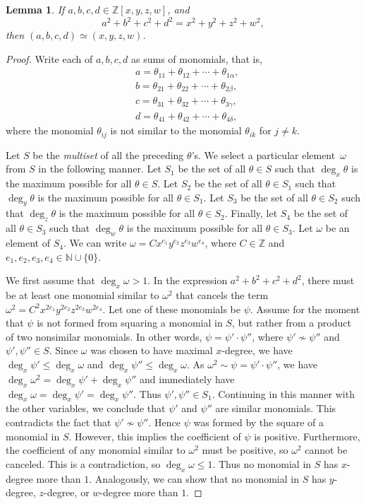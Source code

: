 \documentclass[12pt,table]{article}
\newtheorem{lemma}[theorem]{Lemma}
\theoremstyle{definition}
\theoremstyle{remark}
\newcommand{\Nnn}{\mathbb N}
\newcommand{\Zzz}{\mathbb Z}
\numberwithin{equation}{section}
\begin{document}
\begin{lemma}
If $a, b, c, d \in \Zzz[x,y,z,w]$, and
\[
a^2 + b^2 + c^2 + d^2 = x^2 + y^2 + z^2 + w^2,
\]
then $ (a, b, c, d ) \simeq (x, y, z, w )$.
\end{lemma}
\begin{proof}
Write each of $ a,b,c,d $ as sums of monomials, that is, 
\begin{align*}
&a = \theta_{11} + \theta_{12} + \dotsb + \theta_{1\alpha},
\\
&b = \theta_{21} + \theta_{22} + \dotsb + \theta_{2\beta},
\\
&c = \theta_{31} + \theta_{32} + \dotsb + \theta_{3\gamma},
\\
&d = \theta_{41} + \theta_{42} + \dotsb + \theta_{4\delta},
\end{align*}
where the monomial $ \theta_{ij}$ is not similar
to the monomial $\theta_{ik}$ for $ j \neq k$.

Let $S$ be the \emph{multiset} of all the preceding $ \theta $'s.
We select a particular element~$ \omega $
from $S$ in the following manner.
Let $ S_1 $ be the set of all $ \theta \in S  $ such that
$ \deg_x \theta $ is the maximum possible for all $ \theta \in S $.
Let $ S_2 $ be the set of all $ \theta \in S_1  $ such that
$ \deg_y \theta $ is the maximum possible for all $ \theta \in S_1 $.
Let $ S_3 $ be the set of all $ \theta \in S_2  $ such that
$ \deg_z \theta $ is the maximum possible for all $ \theta \in S_2 $.
Finally, let $ S_4 $ be the set of all $ \theta \in S_3  $ such that
$ \deg_w \theta $ is the maximum possible for all $ \theta \in S_3 $.
Let $ \omega $ be an element of $ S_4 $. 
We can write $ \omega = Cx^{e_1}y^{e_2}z^{e_3}w^{e_4}$, where $ C \in \Zzz $
and $ e_1,e_2,e_3,e_4 \in \Nnn \cup \{0\} $.

We first assume that $\deg_x \omega > 1 $.
In the expression  
$a^2 + b^2 + c^2 + d^2$, there must be at least one monomial similar to $ \omega^2 $
that cancels the term $ \omega^2 = C^2x^{2e_1}y^{2e_2}z^{2e_3}w^{2e_4}$.
Let one of these monomials be $ \psi $. Assume for the moment that $ \psi $
is not formed from squaring a monomial in $S$, but rather
from a product of two nonsimilar monomials.
In other words, $ \psi = \psi' \cdot \psi''$, where $ \psi' \nsim \psi'' $
and $ \psi' , \psi'' \in S $. Since $\omega$ was chosen to have maximal $x$-degree,
we have $\deg_x \psi' \leq \deg_x \omega$ and
$\deg_x \psi'' \leq \deg_x \omega$.
As $\omega^2 \sim \psi = \psi' \cdot \psi''$,
we have $ \deg_x \omega^2 = \deg_x \psi' + \deg_x \psi''$
and immediately have $ \deg_x \omega = \deg_x \psi' = \deg_x \psi'' $.
Thus $ \psi' , \psi'' \in S_1 $. Continuing in this manner
with the other variables, we
conclude that $ \psi' $ and $ \psi'' $ are similar monomials.
This contradicts the fact that $ \psi' \nsim \psi'' $.
Hence $ \psi $ was
formed by the square of a monomial in $ S $. However, this implies the coefficient
of $ \psi $ is positive. Furthermore, the coefficient of
any monomial similar to $ \omega^2 $ must be positive,
so $ \omega^2 $ cannot be canceled. This is
a contradiction, so $ \deg_x \omega \leq 1 $. Thus no monomial in $S$ has $x$-degree more
than $1$. Analogously, we can show that no monomial in $S$ has $y$-degree, $z$-degree,
or $w$-degree more than $1$.


\end{proof}
\end{document}
